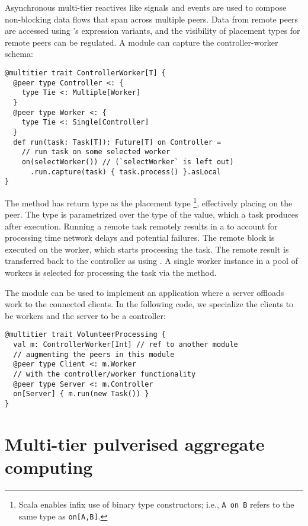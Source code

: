Asynchronous multi-tier reactives like signals and events are used to compose non-blocking data flows that span across multiple peers. 
%
Data from remote peers are accessed using \scalaloci{}'s  expression variants,
 and the visibility of placement types for remote peers can be regulated.
%
A  module can capture the controller-worker schema:
\begin{lstlisting}
@multitier trait ControllerWorker[T] {
  @peer type Controller <: { 
    type Tie <: Multiple[Worker]
  }
  @peer type Worker <: { 
    type Tie <: Single[Controller] 
  }
  def run(task: Task[T]): Future[T] on Controller =
    // run task on some selected worker
    on(selectWorker()) // (`selectWorker` is left out) 
      .run.capture(task) { task.process() }.asLocal
}
\end{lstlisting}
The  method has return type as the placement type \footnote{Scala enables infix use of binary type constructors;  i.e., \texttt{A on B} refers to the same type as \texttt{on[A,B]}.}, effectively placing  on the  peer. 
%
The  type is parametrized over the type  of the value, which a task produces after execution. 
%
Running a remote task remotely results in a  to account for processing time network delays and potential failures. 
%
The remote block is executed on the worker, which starts processing the task. 
%
The remote result is transferred back to the controller as  using . 
%
A single worker instance in a pool of workers is selected for processing the task via the  method. 

The module can be used to implement an application where a server offloads work
 to the connected clients. In the following code, 
we specialize the clients to be workers and the server to be a controller:

\begin{lstlisting}
@multitier trait VolunteerProcessing {
  val m: ControllerWorker[Int] // ref to another module
  // augmenting the peers in this module
  @peer type Client <: m.Worker
  // with the controller/worker functionality
  @peer type Server <: m.Controller    
  on[Server] { m.run(new Task()) }
}
\end{lstlisting}

\section{Multi-tier pulverised aggregate computing}
\label{multitier+pulverisation}

